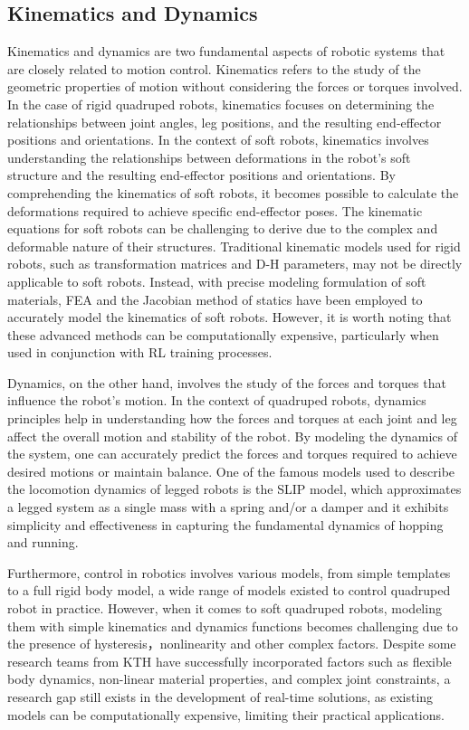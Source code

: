 \subsection{Kinematics and Dynamics}
Kinematics and dynamics are two fundamental aspects of robotic systems that are closely related to motion control. Kinematics refers to the study of the geometric properties of motion without considering the forces or torques involved. In the case of rigid quadruped robots, kinematics focuses on determining the relationships between joint angles, leg positions, and the resulting end-effector positions and orientations. In the context of soft robots, kinematics involves understanding the relationships between deformations in the robot's soft structure and the resulting end-effector positions and orientations. By comprehending the kinematics of soft robots, it becomes possible to calculate the deformations required to achieve specific end-effector poses. The kinematic equations for soft robots can be challenging to derive due to the complex and deformable nature of their structures. Traditional kinematic models used for rigid robots, such as transformation matrices and \ac{D-H} parameters, may not be directly applicable to soft robots\cite{fang2020Kinematics}. Instead, with precise modeling formulation of soft materials, \ac{FEA}\cite{lee2017FEMbased} and the Jacobian method of statics\cite{giorelli2015Neural} have been employed to accurately model the kinematics of soft robots. However, it is worth noting that these advanced methods can be computationally expensive, particularly when used in conjunction with \ac{RL} training processes. 

Dynamics, on the other hand, involves the study of the forces and torques that influence the robot's motion. In the context of quadruped robots, dynamics principles help in understanding how the forces and torques at each joint and leg affect the overall motion and stability of the robot. By modeling the dynamics of the system, one can accurately predict the forces and torques required to achieve desired motions or maintain balance. One of the famous models used to describe the locomotion dynamics of legged robots is the \ac{SLIP} model\cite{poulakakis2009Spring}, which approximates a legged system as a single mass with a spring and/or a damper and it exhibits simplicity and effectiveness in capturing the fundamental dynamics of hopping and running.

Furthermore, control in robotics involves various models, from simple templates to a full rigid body model, a wide range of models existed to control quadruped robot in practice\cite{hwangbo2018Simulation}. However, when it comes to soft quadruped robots, modeling them with simple kinematics and dynamics functions becomes challenging due to the presence of hysteresis，nonlinearity and other complex factors. Despite some research teams from KTH\cite{danelia2021Structure, lagrelius2022Comparing} have successfully incorporated factors such as flexible body dynamics, non-linear material properties, and complex joint constraints, a research gap still exists in the development of real-time solutions, as existing models can be computationally expensive, limiting their practical applications.

